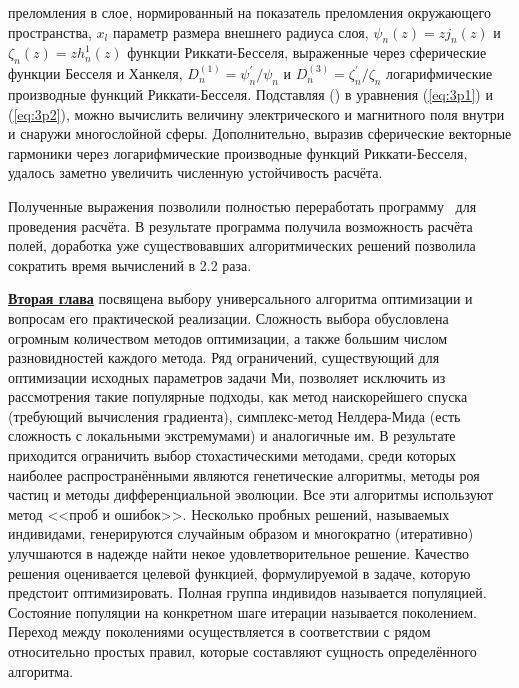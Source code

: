преломления в слое, нормированный на показатель преломления
окружающего пространства, $x_l$ параметр размера внешнего радиуса
слоя, $\psi_{n}(z) = z j_n(z)$ и $\zeta_{n}(z) = z h_n^1(z)$ функции
Риккати-Бесселя, выраженные через сферические функции Бесселя и
Ханкеля, $D^{(1)}_{n} = \psi^{\prime}_{n}/\psi_{n}$ и
$D^{(3)}_{n} = \zeta^{\prime}_{n}/\zeta_{n}$ логарифмические
производные функций Риккати-Бесселя. Подставляя
() в уравнения (\ref{eq:3p1}) и
(\ref{eq:3p2}), можно вычислить величину электрического и магнитного
поля внутри и снаружи многослойной сферы. Дополнительно, выразив
сферические векторные гармоники через логарифмические производные
функций Риккати-Бесселя, удалось заметно увеличить численную
устойчивость расчёта.

Полученные выражения позволили полностью переработать
программу~\cite{Scattnlay-web} для проведения расчёта.  В результате
программа получила возможность расчёта полей, доработка уже
существовавших алгоритмических решений позволила сократить время
вычислений в 2.2 раза.

\underline{\textbf{Вторая глава}} посвящена выбору универсального
алгоритма оптимизации и вопросам его практической
реализации. Сложность выбора обусловлена огромным количеством методов
оптимизации, а также большим числом разновидностей каждого метода. Ряд
ограничений, существующий для оптимизации исходных параметров задачи
Ми, позволяет исключить из рассмотрения такие популярные подходы, как
метод наискорейшего спуска (требующий вычисления градиента),
симплекс-метод Нелдера-Мида (есть сложность с локальными
экстремумами) и аналогичные им. В результате приходится ограничить
выбор стохастическими методами, среди которых наиболее
распространёнными являются генетические алгоритмы, методы роя частиц и
методы дифференциальной эволюции.  Все эти алгоритмы используют метод
<<проб и ошибок>>.  Несколько пробных решений, называемых индивидами,
генерируются случайным образом и многократно (итеративно) улучшаются в
надежде найти некое удовлетворительное решение. Качество решения
оценивается целевой функцией, формулируемой в задаче, которую
предстоит оптимизировать.  Полная группа индивидов называется
популяцией.  Состояние популяции на конкретном шаге итерации
называется поколением.  Переход между поколениями осуществляется в
соответствии с рядом относительно простых правил, которые составляют
сущность определённого алгоритма.

